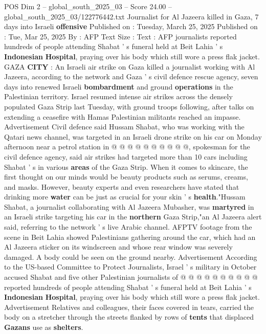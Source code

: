 \begin{textsample}{POS Dim 2 – global\_south\_2025\_03 – Score 24.00 – global\_south\_2025\_03/122776442.txt}  \label{ex:f2_pos_306}
Journalist for Al Jazeera killed in Gaza, 7 days into Israeli \textbf{offensive} Published on : Tuesday, March 25, 2025 Published on : Tue, Mar 25, 2025 By : AFP Text Size : Text : AFP journalists reported hundreds of people attending Shabat ' s funeral held at Beit Lahia ' s \textbf{Indonesian} \textbf{Hospital}, praying over his body which still wore a press flak jacket.
GAZA \textbf{CITY} : An Israeli air strike on Gaza killed a journalist working with Al Jazeera, according to the network and Gaza ' s civil defence rescue agency, seven days into renewed Israeli \textbf{bombardment} and ground \textbf{operations} in the Palestinian territory.
Israel resumed intense air strikes across the densely populated Gaza Strip last Tuesday, with ground troops following, after talks on extending a ceasefire with Hamas Palestinian militants reached an impasse.
Advertisement Civil defence said Hussam Shabat, who was working with the Qatari news channel, was targeted in an Israeli drone strike on his car on Monday afternoon near a petrol station in @ @ @ @ @ @ @ @ @ @, spokesman for the civil defence agency, said air strikes had targeted more than 10 cars including Shabat ' s in various \textbf{areas} of the Gaza Strip.
When it comes to skincare, the first thought on our minds would be beauty products such as serums, creams, and masks.
However, beauty experts and even researchers have stated that drinking more \textbf{water} can be just as crucial for your skin ' s \textbf{health}."Hussam Shabat, a journalist collaborating with Al Jazeera Mubasher, was \textbf{martyred} in an Israeli strike targeting his car in the \textbf{northern} Gaza Strip,"an Al Jazeera alert said, referring to the network ' s live Arabic channel.
AFPTV footage from the scene in Beit Lahia showed Palestinians gathering around the car, which had an Al Jazeera sticker on its windscreen and whose rear window was severely damaged.
A body could be seen on the ground nearby.
Advertisement According to the US-based Committee to Protect Journalists, Israel ' s military in October accused Shabat and five other Palestinian journalists of @ @ @ @ @ @ @ @ @ @ reported hundreds of people attending Shabat ' s funeral held at Beit Lahia ' s \textbf{Indonesian} \textbf{Hospital}, praying over his body which still wore a press flak jacket.
Advertisement Relatives and colleagues, their faces covered in tears, carried the body on a stretcher through the streets flanked by rows of \textbf{tents} that displaced \textbf{Gazans} use as \textbf{shelters}.

\end{textsample}
